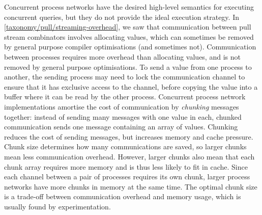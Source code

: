 Concurrent process networks have the desired high-level semantics for executing concurrent queries, but they do not provide the ideal execution strategy.
In \cref{taxonomy/pull/streaming-overhead}, we saw that communication between pull stream combinators involves allocating \Hs@Maybe@ values, which can sometimes be removed by general purpose compiler optimisations (and sometimes not).
Communication between processes requires more overhead than allocating \Hs@Maybe@ values, and is not removed by general purpose optimisations.
To send a value from one process to another, the sending process may need to lock the communication channel to ensure that it has exclusive access to the channel, before copying the value into a buffer where it can be read by the other process.
Concurrent process network implementations amortise the cost of communication by \emph{chunking} messages together: instead of sending many messages with one value in each, chunked communication sends one message containing an array of values.
Chunking reduces the cost of sending messages, but increases memory and cache pressure.
Chunk size determines how many communications are saved, so larger chunks mean less communication overhead.
However, larger chunks also mean that each chunk array requires more memory and is thus less likely to fit in cache.
Since each channel between a pair of processes requires its own chunk, larger process networks have more chunks in memory at the same time.
The optimal chunk size is a trade-off between communication overhead and memory usage, which is usually found by experimentation.



